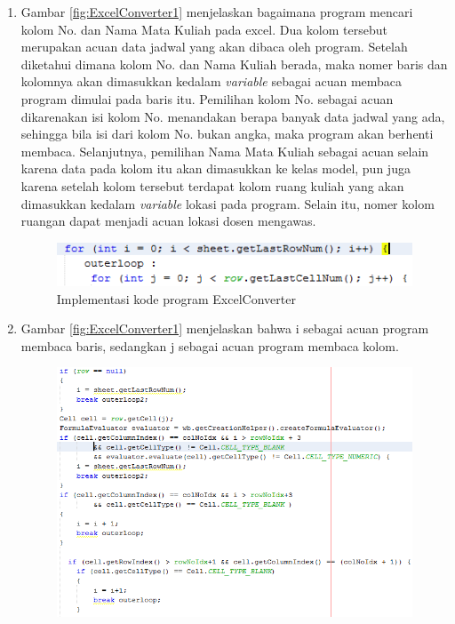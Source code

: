 \begin{enumerate}
\begin{enumerate}
		\item Gambar \ref{fig:ExcelConverter1} menjelaskan bagaimana program mencari kolom No. dan Nama Mata Kuliah pada excel. Dua kolom tersebut merupakan acuan data jadwal yang akan dibaca oleh program. Setelah diketahui dimana kolom No. dan Nama Kuliah berada, maka nomer baris dan kolomnya akan dimasukkan kedalam \textit{variable} sebagai acuan membaca program dimulai pada baris itu. Pemilihan kolom No. sebagai acuan dikarenakan isi kolom No. menandakan berapa banyak data jadwal yang ada, sehingga bila isi dari kolom No. bukan angka, maka program akan berhenti membaca. Selanjutnya, pemilihan Nama Mata Kuliah sebagai acuan selain karena data pada kolom itu akan dimasukkan ke kelas model, pun juga karena setelah kolom tersebut terdapat kolom ruang kuliah yang akan dimasukkan kedalam \textit{variable} lokasi pada program.
		Selain itu, nomer kolom ruangan dapat menjadi acuan lokasi dosen mengawas.
		\begin{figure}[H]
		\centering
		\includegraphics[scale=0.7]{Gambar/excelConverter2}
		\caption{Implementasi kode program ExcelConverter}
		\label{fig:ExcelConverter2}
		\end{figure}
		\item  Gambar \ref{fig:ExcelConverter1} menjelaskan bahwa i sebagai acuan program membaca baris, sedangkan j sebagai acuan program membaca kolom.
		\begin{figure}[H]
		\centering
		\includegraphics[scale=0.7]{Gambar/excelConverter3}

\end{figure}
\end{enumerate}
\end{enumerate}
